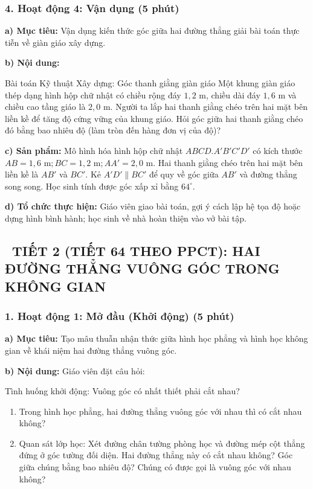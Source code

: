 \documentclass[12pt, a4paper]{article}
\begin{document}
\subsubsection*{4. Hoạt động 4: Vận dụng (5 phút)}

\noindent \textbf{a) Mục tiêu:}
Vận dụng kiến thức góc giữa hai đường thẳng giải bài toán thực tiễn về giàn giáo xây dựng.

\noindent \textbf{b) Nội dung:}
\begin{stembox}{Bài toán Kỹ thuật Xây dựng: Góc thanh giằng giàn giáo}
Một khung giàn giáo thép dạng hình hộp chữ nhật có chiều rộng đáy $1{,}2\text{ m}$, chiều dài đáy $1{,}6\text{ m}$ và chiều cao tầng giáo là $2{,}0\text{ m}$. Người ta lắp hai thanh giằng chéo trên hai mặt bên liền kề để tăng độ cứng vững của khung giáo.
Hỏi góc giữa hai thanh giằng chéo đó bằng bao nhiêu độ (làm tròn đến hàng đơn vị của độ)?
\end{stembox}

\noindent \textbf{c) Sản phẩm:}
Mô hình hóa hình hộp chữ nhật $ABCD.A'B'C'D'$ có kích thước $AB = 1{,}6\text{ m}; BC = 1{,}2\text{ m}; AA' = 2{,}0\text{ m}$.
Hai thanh giằng chéo trên hai mặt bên liền kề là $AB'$ và $BC'$.
Kẻ $A'D' \parallel BC'$ để quy về góc giữa $AB'$ và đường thẳng song song.
Học sinh tính được góc xấp xỉ bằng $64^\circ$.

\noindent \textbf{d) Tổ chức thực hiện:}
Giáo viên giao bài toán, gợi ý cách lập hệ tọa độ hoặc dựng hình bình hành; học sinh về nhà hoàn thiện vào vở bài tập.

\vspace{10pt}

\subsection*{\faClockO \ TIẾT 2 (TIẾT 64 THEO PPCT): HAI ĐƯỜNG THẲNG VUÔNG GÓC TRONG KHÔNG GIAN}

\subsubsection*{1. Hoạt động 1: Mở đầu (Khởi động) (5 phút)}

\noindent \textbf{a) Mục tiêu:}
Tạo mâu thuẫn nhận thức giữa hình học phẳng và hình học không gian về khái niệm hai đường thẳng vuông góc.

\noindent \textbf{b) Nội dung:}
Giáo viên đặt câu hỏi:
\begin{pedabox}{Tình huống khởi động: Vuông góc có nhất thiết phải cắt nhau?}
\begin{enumerate}[leftmargin=0.6cm]
    \item Trong hình học phẳng, hai đường thẳng vuông góc với nhau thì có cắt nhau không?
    \item Quan sát lớp học: Xét đường chân tường phòng học và đường mép cột thẳng đứng ở góc tường đối diện. Hai đường thẳng này có cắt nhau không? Góc giữa chúng bằng bao nhiêu độ? Chúng có được gọi là vuông góc với nhau không?
\end{enumerate}
\end{pedabox}
\end{document}
